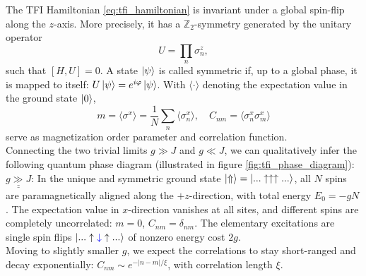\noindent The TFI Hamiltonian \eqref{eq:tfi_hamiltonian} is invariant under a global spin-flip along the $z$-axis. More precisely, it has a $\mathbb{Z}_2$-symmetry generated by the unitary operator 
\begin{equation}
	U = \prod_n \sigma^z_n,
\end{equation}
such that $[H, U] = 0$. A state $\ket{\psi}$ is called symmetric if, up to a global phase, it is mapped to itself: $U \ket{\psi} = e^{i\varphi} \ket{\psi}$. With $\langle \cdot \rangle$ denoting the expectation value in the ground state $\ket{0}$, 
\begin{equation}
	m = \langle \sigma^x \rangle = \frac{1}{N} \sum_{n} \langle \sigma^x_n \rangle, \hspace{1em}
	C_{nm} = \langle \sigma^x_n \sigma^x_m \rangle
\end{equation}
serve as magnetization order parameter and correlation function. \\[0.5em]

\noindent Connecting the two trivial limits $g \gg J$ and $g \ll J$, we can qualitatively infer the following quantum phase diagram (illustrated in figure \ref{fig:tfi_phase_diagram}): \\

\noindent $\underline{\underline{g \gg J}}$: In the unique and symmetric ground state $\ket{\Uparrow} = \ket{... \uparrow \uparrow \uparrow ...}$, all $N$ spins are paramagnetically aligned along the $+z$-direction, with total energy $E_0 = - gN$. The expectation value in $x$-direction vanishes at all sites, and different spins are completely uncorrelated: $m = 0$, $C_{nm} = \delta_{nm}$. The elementary excitations are single spin flips $\ket{... \uparrow \textcolor{blue}{\downarrow} \uparrow ...}$ of nonzero energy cost $2g$. \\
Moving to slightly smaller $g$, we expect the correlations to stay short-ranged and decay exponentially: $C_{nm} \sim e^{-\vert n - m \vert / \xi}$, with correlation length $\xi$. \\

